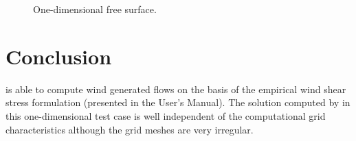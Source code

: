 \begin{figure}[H]
 \centering
 \caption{One-dimensional free surface.}
 \label{t2d:wind:fig:freeS1d}
\end{figure}

\section{Conclusion}
 is able to compute wind generated flows on the basis of 
the empirical wind shear stress formulation  (presented in the User's Manual). 
The solution computed by  in this one-dimensional test case is well independent 
of the computational grid characteristics although the grid meshes are very irregular.

